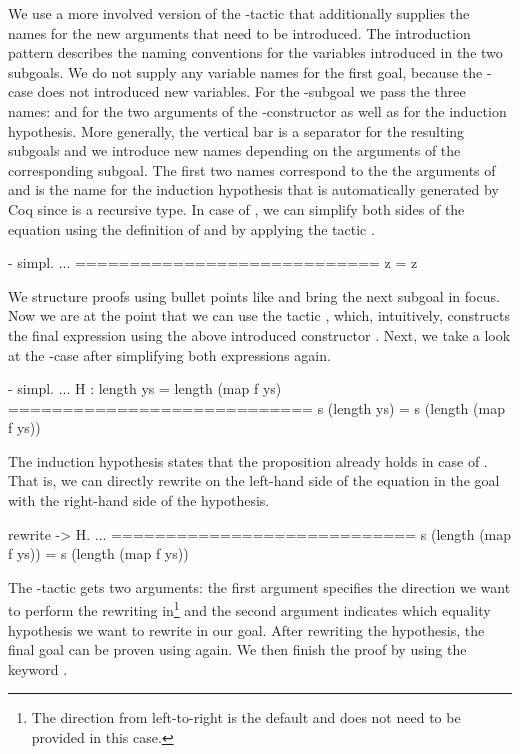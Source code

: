 We use a more involved version of the -tactic that additionally supplies the names for the new arguments that need to be introduced.
The introduction pattern \cinl{[ | y ys H ]} describes the naming conventions for the variables introduced in the two subgoals.
We do not supply any variable names for the first goal, because the -case does not introduced new variables.
For the -subgoal we pass the three names:  and  for the two arguments of the -constructor as well as  for the induction hypothesis.
More generally, the vertical bar is a separator for the resulting subgoals and we introduce new names depending on the arguments of the corresponding subgoal.
The first two names correspond to the the arguments of  and  is the name for the induction hypothesis that is automatically generated by Coq since  is a recursive type.
In case of , we can simplify both sides of the equation using the definition of  and  by applying the tactic .

\begin{cproof}{- simpl.}
  ...
  ============================
  z = z
\end{cproof}

We structure proofs using bullet points like \cinl{-,+,*} and bring the next subgoal in focus.
Now we are at the point that we can use the tactic , which, intuitively, constructs the final expression using the above introduced constructor .
Next, we take a look at the -case after simplifying both expressions again.

\begin{cproof}{- simpl.}
  ...
  H : length ys = length (map f ys)
  ============================
  s (length ys) = s (length (map f ys))
\end{cproof}

The induction hypothesis  states that the proposition already holds in case of .
That is, we can directly rewrite  on the left-hand side of the equation in the goal with the right-hand side of the hypothesis.

\begin{cproof}{rewrite -> H.}
  ...
  ============================
  s (length (map f ys)) =
  s (length (map f ys))
\end{cproof}

The -tactic gets two arguments: the first argument specifies the direction we want to perform the rewriting in\footnote{The direction from left-to-right is the default and does not need to be provided in this case.} and the second argument indicates which equality hypothesis we want to rewrite in our goal.
After rewriting the hypothesis, the final goal can be proven using  again.
We then finish the proof by using the keyword .

